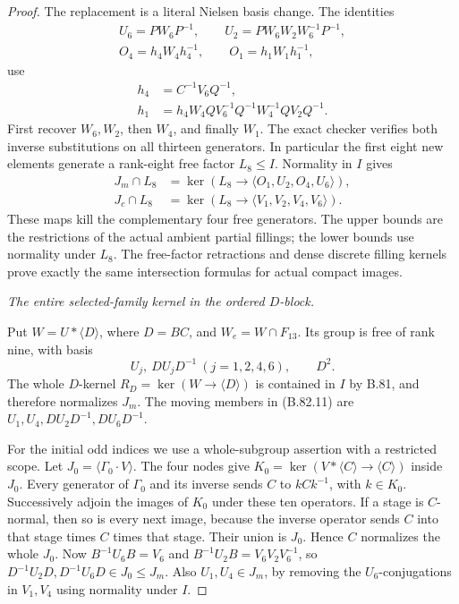 \begin{proof}
The replacement is a literal Nielsen basis change. The identities
\[
 \begin{gathered}
 U_6=PW_6P^{-1},\qquad
 U_2=PW_6W_2W_6^{-1}P^{-1},\\
 O_4=h_4W_4h_4^{-1},\qquad O_1=h_1W_1h_1^{-1},
 \end{gathered}
 \tag{B.82.8}
\]
use
\[
 \begin{split}
 h_4&=C^{-1}V_6Q^{-1},\\
 h_1&=h_4W_4QV_6^{-1}Q^{-1}W_4^{-1}QV_2Q^{-1}.
 \end{split}
 \tag{B.82.9}
\]
First recover \(W_6,W_2\), then \(W_4\), and finally \(W_1\).
The exact checker verifies both inverse substitutions on all thirteen
generators. In particular the first eight new elements generate a
rank-eight free factor \(L_8\le I\). Normality in \(I\) gives
\[
 \begin{split}
 J_m\cap L_8&=\ker(L_8\longrightarrow
                  \langle O_1,U_2,O_4,U_6\rangle),\\
 J_c\cap L_8&=\ker(L_8\longrightarrow
                  \langle V_1,V_2,V_4,V_6\rangle).
 \end{split}
 \tag{B.82.10}
\]
These maps kill the complementary four free generators. The upper
bounds are the restrictions of the actual ambient partial fillings;
the lower bounds use normality under \(L_8\). The free-factor
retractions and dense discrete filling kernels prove exactly the same
intersection formulas for actual compact images.

\emph{The entire selected-family kernel in the ordered \(D\)-block.}\par\nopagebreak
Put \(W=U*\langle D\rangle\), where \(D=BC\), and
\(W_e=W\cap F_{13}\). Its group is free of rank nine, with basis
\[
 U_j,\ DU_jD^{-1}\ (j=1,2,4,6),\qquad D^2.
 \tag{B.82.11}
\]
The whole \(D\)-kernel \(R_D=\ker(W\to\langle D\rangle)\)
is contained in \(I\) by B.81, and therefore normalizes \(J_m\).
The moving members in (B.82.11) are
\(U_1,U_4,DU_2D^{-1},DU_6D^{-1}\).

For the initial odd indices we use a whole-subgroup assertion with a
restricted scope. Let \(J_0=\langle\Gamma_0\cdot V\rangle\).
The four nodes give \(K_0=\ker(V*\langle C\rangle\to\langle C\rangle)\)
inside \(J_0\). Every generator of \(\Gamma_0\) and its inverse
sends \(C\) to \(kCk^{-1}\), with \(k\in K_0\). Successively
adjoin the images of \(K_0\) under these ten operators. If a stage is
\(C\)-normal, then so is every next image, because the inverse
operator sends \(C\) into that stage times \(C\) times that stage.
Their union is \(J_0\). Hence \(C\) normalizes the whole \(J_0\).
Now \(B^{-1}U_6B=V_6\) and
\(B^{-1}U_2B=V_6V_2V_6^{-1}\), so
\(D^{-1}U_2D,D^{-1}U_6D\in J_0\le J_m\).
Also \(U_1,U_4\in J_m\), by removing the \(U_6\)-conjugations
in \(V_1,V_4\) using normality under \(I\).


\end{proof}

